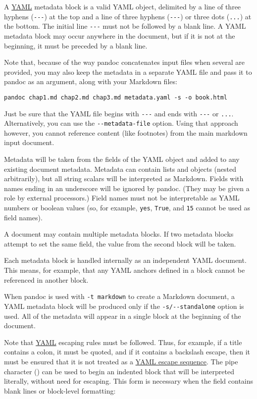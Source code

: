 \documentclass[
  a4paper,
]{article}
\begin{document}
A \href{https://yaml.org/spec/1.2/spec.html}{YAML} metadata block is a
valid YAML object, delimited by a line of three hyphens
(\texttt{-\/-\/-}) at the top and a line of three hyphens
(\texttt{-\/-\/-}) or three dots (\texttt{...}) at the bottom. The
initial line \texttt{-\/-\/-} must not be followed by a blank line. A
YAML metadata block may occur anywhere in the document, but if it is not
at the beginning, it must be preceded by a blank line.

Note that, because of the way pandoc concatenates input files when
several are provided, you may also keep the metadata in a separate YAML
file and pass it to pandoc as an argument, along with your Markdown
files:

\begin{verbatim}
pandoc chap1.md chap2.md chap3.md metadata.yaml -s -o book.html
\end{verbatim}

Just be sure that the YAML file begins with \texttt{-\/-\/-} and ends
with \texttt{-\/-\/-} or \texttt{...}. Alternatively, you can use the
\texttt{-\/-metadata-file} option. Using that approach however, you
cannot reference content (like footnotes) from the main markdown input
document.

Metadata will be taken from the fields of the YAML object and added to
any existing document metadata. Metadata can contain lists and objects
(nested arbitrarily), but all string scalars will be interpreted as
Markdown. Fields with names ending in an underscore will be ignored by
pandoc. (They may be given a role by external processors.) Field names
must not be interpretable as YAML numbers or boolean values (so, for
example, \texttt{yes}, \texttt{True}, and \texttt{15} cannot be used as
field names).

A document may contain multiple metadata blocks. If two metadata blocks
attempt to set the same field, the value from the second block will be
taken.

Each metadata block is handled internally as an independent YAML
document. This means, for example, that any YAML anchors defined in a
block cannot be referenced in another block.

When pandoc is used with \texttt{-t\ markdown} to create a Markdown
document, a YAML metadata block will be produced only if the
\texttt{-s/-\/-standalone} option is used. All of the metadata will
appear in a single block at the beginning of the document.

Note that \href{https://yaml.org/spec/1.2/spec.html}{YAML} escaping
rules must be followed. Thus, for example, if a title contains a colon,
it must be quoted, and if it contains a backslash escape, then it must
be ensured that it is not treated as a
\href{https://yaml.org/spec/1.2/spec.html\#id2776092}{YAML escape
sequence}. The pipe character (\texttt{\textbar{}}) can be used to begin
an indented block that will be interpreted literally, without need for
escaping. This form is necessary when the field contains blank lines or
block-level formatting:
\end{document}
